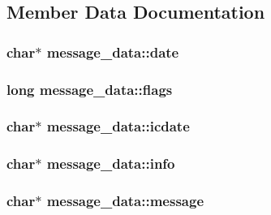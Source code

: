 \subsection{Member Data Documentation}
\hypertarget{structmessage__data_a6ab4c9b9a0f22a2bdabd8f9cfac312ad}{
\subsubsection[{date}]{\setlength{\rightskip}{0pt plus 5cm}char$\ast$ message\-\_\-data\-::date}}\label{structmessage__data_a6ab4c9b9a0f22a2bdabd8f9cfac312ad}
\hypertarget{structmessage__data_af7cf3761d12c356ef956a6310d238796}{
\subsubsection[{flags}]{\setlength{\rightskip}{0pt plus 5cm}long message\-\_\-data\-::flags}}\label{structmessage__data_af7cf3761d12c356ef956a6310d238796}
\hypertarget{structmessage__data_af68425ba43f8e70ee0c6fecb750154de}{
\subsubsection[{icdate}]{\setlength{\rightskip}{0pt plus 5cm}char$\ast$ message\-\_\-data\-::icdate}}\label{structmessage__data_af68425ba43f8e70ee0c6fecb750154de}
\hypertarget{structmessage__data_af31540c3a3a2deea7204404d96514edd}{
\subsubsection[{info}]{\setlength{\rightskip}{0pt plus 5cm}char$\ast$ message\-\_\-data\-::info}}\label{structmessage__data_af31540c3a3a2deea7204404d96514edd}
\hypertarget{structmessage__data_a053ca95bb66adde61826498e8330fc9c}{
\subsubsection[{message}]{\setlength{\rightskip}{0pt plus 5cm}char$\ast$ message\-\_\-data\-::message}}\label{structmessage__data_a053ca95bb66adde61826498e8330fc9c}
